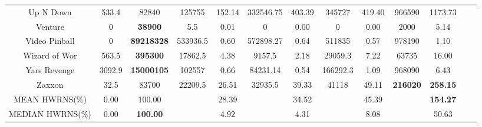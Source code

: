 \documentclass[nohyperref]{article}
\def\GDIHmeanHWRNS{154.27}
\def\GDIHmedianHWRNS{50.63}
\def\rainbowmeanHWRNS{28.39}
\def\rainbowmedianHWRNS{4.92}
\def\impalameanHWRNS{34.52}
\def\impalamedianHWRNS{4.31}
\def\lasermeanHWRNS{45.39}
\def\lasermedianHWRNS{8.08}
\theoremstyle{plain}
\begin{document}
\begin{table}[!hb]
\begin{center}
\begin{tabular}{|c| c| c| c c| c c| c c| c c| c c|}
 Up N Down          & 533.4     & 82840     & 125755   &152.14  & 332546.75  & 403.39     & 345727  & 419.40    &966590          &1173.73  \\
 Venture            & 0         & \textbf{38900}     & 5.5      &0.01    & 0          & 0.00       & 0       & 0.00              &2000            &5.14\\
 Video Pinball      & 0         & \textbf{89218328}  & 533936.5 &0.60    & 572898.27  & 0.64       & 511835  & 0.57              &978190          &1.10\\
 Wizard of Wor      & 563.5     & \textbf{395300}    & 17862.5  &4.38    & 9157.5     & 2.18       & 29059.3 & 7.22              &63735           &16.00\\
 Yars Revenge       & 3092.9    & \textbf{15000105}  & 102557   &0.66    & 84231.14   & 0.54       & 166292.3& 1.09              &968090          &6.43\\
 Zaxxon             & 32.5      & 83700     & 22209.5  &26.51   & 32935.5    & 39.33      & 41118   & 49.11      &\textbf{216020}          &\textbf{258.15}\\
\hline
MEAN HWRNS(\%)      & 0.00      & 100.00    &          & \rainbowmeanHWRNS  &            & \impalameanHWRNS  &        & \lasermeanHWRNS  &      & \textbf{\GDIHmeanHWRNS} \\
\hline   
MEDIAN HWRNS(\%)    & 0.00      & \textbf{100.00}    &          & \rainbowmedianHWRNS   &            & \impalamedianHWRNS &        & \lasermedianHWRNS  &      & \GDIHmedianHWRNS  \\
\hline   
\end{tabular}
\end{center}
\end{table}
\clearpage
\end{document}
